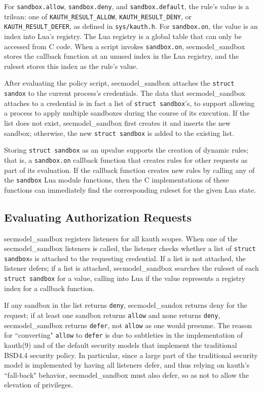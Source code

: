 \documentclass[letterpaper,twocolumn,9pt]{article}
\begin{document}
For \texttt{sandbox.allow}, \texttt{sandbox.deny}, and
\texttt{sandbox.default}, the rule's value is a trilean: one of
\texttt{KAUTH\_RESULT\_ALLOW}, \texttt{KAUTH\_RESULT\_DENY}, or
\texttt{KAUTH\_RESULT\_DEFER}, as defined in \texttt{sys/kauth.h}.  For
\texttt{sandbox.on}, the value is an index into Lua's registry.  The Lua
registry is a global table that can only be accessed from C code.  When a
script invokes \texttt{sandbox.on}, secmodel\_sandbox stores the callback
function at an unused index in the Lua registry, and the ruleset stores this
index as the rule's value.

After evaluating the policy script, secmodel\_sandbox attaches the
\texttt{struct sandox} to the current process's credentials.  The data that
secmodel\_sandbox attaches to a credential is in fact a list of \texttt{struct
sandbox}'s, to support allowing a process to apply multiple sandboxes during
the course of its execution.  If the list does not exist, secmodel\_sandbox
first creates it and inserts the new sandbox; otherwise, the new \texttt{struct
sandbox} is added to the existing list.

Storing \texttt{struct sandbox} as an upvalue supports the creation of
dynamic rules; that is, a \texttt{sandbox.on} callback function that
creates rules for other requests as part of its evaluation.  If the callback
function creates new rules by calling any of the \texttt{sandbox} Lua module
functions, then the C implementations of these functions can immediately find
the corresponding ruleset for the given Lua state.

\subsection{Evaluating Authorization Requests}
secmodel\_sandbox registers listeners for all kauth scopes.  When one of the
secmodel\_sandbox listeners is called, the listener checks whether a list of
\texttt{struct sandbox}s is attached to the requesting credential.  If a list
is not attached, the listener defers; if a list is attached, secmodel\_sandbox
searches the ruleset of each \texttt{struct sandbox} for a value, calling into
Lua if the value represents a registry index for a callback function.   

If any sandbox in the list returns \texttt{deny}, secmodel\_sandox returns deny
for the request; if at least one sandbox returns \texttt{allow} and none
returns \texttt{deny}, secmodel\_sandbox returns \texttt{defer}, not
\texttt{allow} as one would presume.  The reason for ``converting"
\texttt{allow} to \texttt{defer} is due to subtleties in the implementation of
kauth(9) and of the default security models that implement the traditional
BSD4.4 security policy.  In particular, since a large part of the traditional
security model is implemented by having all listeners defer, and thus relying
on kauth's ``fall-back" behavior, secmodel\_sandbox must also defer, so as not
to allow the elevation of privileges.
\end{document}

